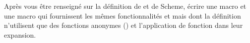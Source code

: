 \begin{Exercise}[title={Macro let et let*}]
Après vous être renseigné sur la définition de  et
 de Scheme, écrire une macro  et
une macro  qui fournissent les mêmes
fonctionnalités et mais dont la définition n'utilisent que des fonctions anonymes
() et l'application de fonction dans leur expansion.
\end{Exercise}